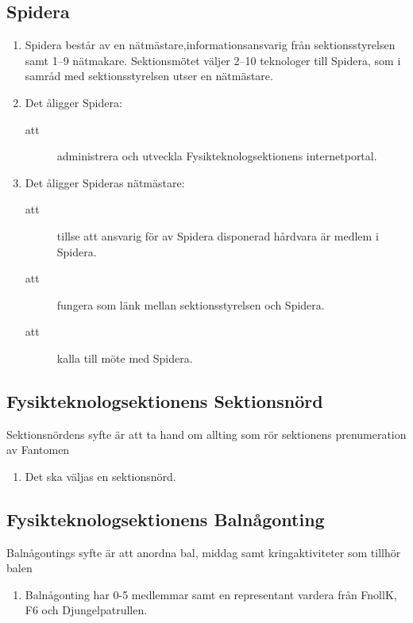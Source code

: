 \documentclass[11pt,a4paper]{article}
\begin{document}
\subsection{Spidera}

\begin{enumerate}[\thesubsection .1]

  \item Spidera består av en nätmästare,informationsansvarig från sektionsstyrelsen samt 1--9
  nätmakare. Sektionsmötet väljer 2--10 teknologer till
  Spidera, som i samråd med sektionsstyrelsen utser en nätmästare.

  \item Det åligger Spidera:
    \begin{description}
      \item[att] administrera och utveckla Fysikteknologsektionens internetportal.
    \end{description}

  \item Det åligger Spideras nätmästare:
    \begin{description}
      \item[att] tillse att ansvarig för av Spidera disponerad hårdvara är medlem i Spidera.
      \item[att] fungera som länk mellan sektionsstyrelsen och Spidera.
      \item[att] kalla till möte med Spidera.
    \end{description}


\end{enumerate}

\subsection{Fysikteknologsektionens Sektionsnörd}
Sektionsnördens syfte är att ta hand om allting som rör sektionens prenumeration av Fantomen
\begin{enumerate}[\thesubsection .1]

  \item Det ska väljas en sektionsnörd.

\end{enumerate}

\subsection{Fysikteknologsektionens Balnågonting}
Balnågontings syfte är att anordna bal, middag samt kringaktiviteter som tillhör balen
\begin{enumerate}[\thesubsection .1]

	\item Balnågonting har 0-5 medlemmar samt en representant vardera från FnollK, F6 och Djungelpatrullen.
  
\end{enumerate}
\end{document}
